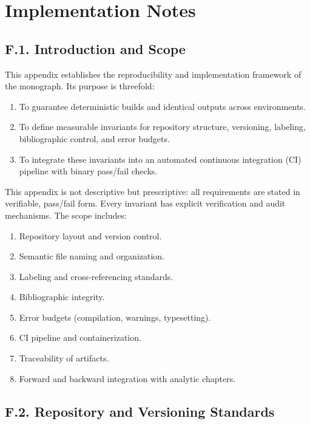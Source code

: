 
\section{Implementation Notes}\label{appF:root}

\subsection*{F.1. Introduction and Scope}

This appendix establishes the reproducibility and implementation
framework of the monograph. Its purpose is threefold:
\begin{enumerate}
  \item To guarantee deterministic builds and identical outputs across
        environments.
  \item To define measurable invariants for repository structure,
        versioning, labeling, bibliographic control, and error budgets.
  \item To integrate these invariants into an automated continuous
        integration (CI) pipeline with binary pass/fail checks.
\end{enumerate}

\noindent This appendix is not descriptive but prescriptive:
all requirements are stated in verifiable, pass/fail form.
Every invariant has explicit verification and audit mechanisms.
The scope includes:
\begin{enumerate}
  \item Repository layout and version control.
  \item Semantic file naming and organization.
  \item Labeling and cross-referencing standards.
  \item Bibliographic integrity.
  \item Error budgets (compilation, warnings, typesetting).
  \item CI pipeline and containerization.
  \item Traceability of artifacts.
  \item Forward and backward integration with analytic chapters.
\end{enumerate}

\subsection*{F.2. Repository and Versioning Standards}

